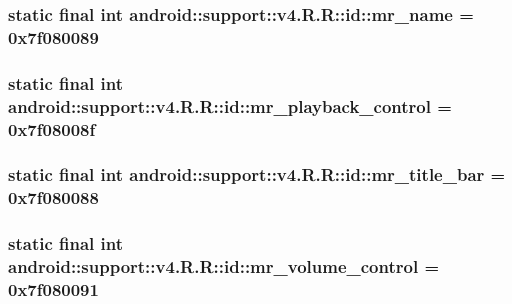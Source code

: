 \hypertarget{classandroid_1_1support_1_1v4_1_1_r_1_1id_654b6f346452cf764c9fa36cfb7cf333}{
\subsubsection[{mr\_\-name}]{\setlength{\rightskip}{0pt plus 5cm}static final int android::support::v4.R.R::id::mr\_\-name = 0x7f080089}}
\label{classandroid_1_1support_1_1v4_1_1_r_1_1id_654b6f346452cf764c9fa36cfb7cf333}


\hypertarget{classandroid_1_1support_1_1v4_1_1_r_1_1id_ccd62f4f21b604da7cb7c1a85c14a2f1}{
\subsubsection[{mr\_\-playback\_\-control}]{\setlength{\rightskip}{0pt plus 5cm}static final int android::support::v4.R.R::id::mr\_\-playback\_\-control = 0x7f08008f}}
\label{classandroid_1_1support_1_1v4_1_1_r_1_1id_ccd62f4f21b604da7cb7c1a85c14a2f1}


\hypertarget{classandroid_1_1support_1_1v4_1_1_r_1_1id_a34f862b2c0d91e725443d3c0f913e88}{
\subsubsection[{mr\_\-title\_\-bar}]{\setlength{\rightskip}{0pt plus 5cm}static final int android::support::v4.R.R::id::mr\_\-title\_\-bar = 0x7f080088}}
\label{classandroid_1_1support_1_1v4_1_1_r_1_1id_a34f862b2c0d91e725443d3c0f913e88}


\hypertarget{classandroid_1_1support_1_1v4_1_1_r_1_1id_579e22c77e2822da29c6b9ff6f6d5b58}{
\subsubsection[{mr\_\-volume\_\-control}]{\setlength{\rightskip}{0pt plus 5cm}static final int android::support::v4.R.R::id::mr\_\-volume\_\-control = 0x7f080091}}
\label{classandroid_1_1support_1_1v4_1_1_r_1_1id_579e22c77e2822da29c6b9ff6f6d5b58}


